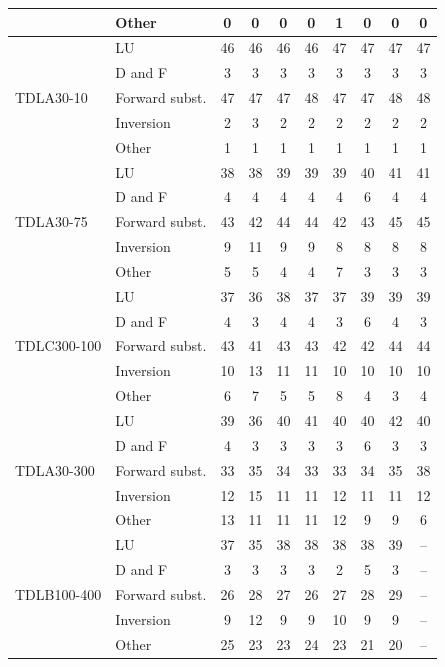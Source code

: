 \begin{table}[htbp]
\begin{tabular}{llcccccccc}
 & Other & 0 & 0 & 0 & 0 & 1 & 0 & 0 & 0 \\
\midrule
\multirow{5}{*}{TDLA30-10} & LU & 46 & 46 & 46 & 46 & 47 & 47 & 47 & 47 \\
 & D and F & 3 & 3 & 3 & 3 & 3 & 3 & 3 & 3 \\
 & Forward subst. & 47 & 47 & 47 & 48 & 47 & 47 & 48 & 48 \\
 & Inversion & 2 & 3 & 2 & 2 & 2 & 2 & 2 & 2 \\
 & Other & 1 & 1 & 1 & 1 & 1 & 1 & 1 & 1 \\
\midrule
\multirow{5}{*}{TDLA30-75} & LU & 38 & 38 & 39 & 39 & 39 & 40 & 41 & 41 \\
 & D and F & 4 & 4 & 4 & 4 & 4 & 6 & 4 & 4 \\
 & Forward subst. & 43 & 42 & 44 & 44 & 42 & 43 & 45 & 45 \\
 & Inversion & 9 & 11 & 9 & 9 & 8 & 8 & 8 & 8 \\
 & Other & 5 & 5 & 4 & 4 & 7 & 3 & 3 & 3 \\
\midrule
\multirow{5}{*}{TDLC300-100} & LU & 37 & 36 & 38 & 37 & 37 & 39 & 39 & 39 \\
 & D and F & 4 & 3 & 4 & 4 & 3 & 6 & 4 & 3 \\
 & Forward subst. & 43 & 41 & 43 & 43 & 42 & 42 & 44 & 44 \\
 & Inversion & 10 & 13 & 11 & 11 & 10 & 10 & 10 & 10 \\
 & Other & 6 & 7 & 5 & 5 & 8 & 4 & 3 & 4 \\
\midrule
\multirow{5}{*}{TDLA30-300} & LU & 39 & 36 & 40 & 41 & 40 & 40 & 42 & 40 \\
 & D and F & 4 & 3 & 3 & 3 & 3 & 6 & 3 & 3 \\
 & Forward subst. & 33 & 35 & 34 & 33 & 33 & 34 & 35 & 38 \\
 & Inversion & 12 & 15 & 11 & 11 & 12 & 11 & 11 & 12 \\
 & Other & 13 & 11 & 11 & 11 & 12 & 9 & 9 & 6 \\
\midrule
\multirow{5}{*}{TDLB100-400} & LU & 37 & 35 & 38 & 38 & 38 & 38 & 39 & -- \\
 & D and F & 3 & 3 & 3 & 3 & 2 & 5 & 3 & -- \\
 & Forward subst. & 26 & 28 & 27 & 26 & 27 & 28 & 29 & -- \\
 & Inversion & 9 & 12 & 9 & 9 & 10 & 9 & 9 & -- \\
 & Other & 25 & 23 & 23 & 24 & 23 & 21 & 20 & -- \\
\bottomrule
\end{tabular}
\vspace{4pt}
\end{table}


